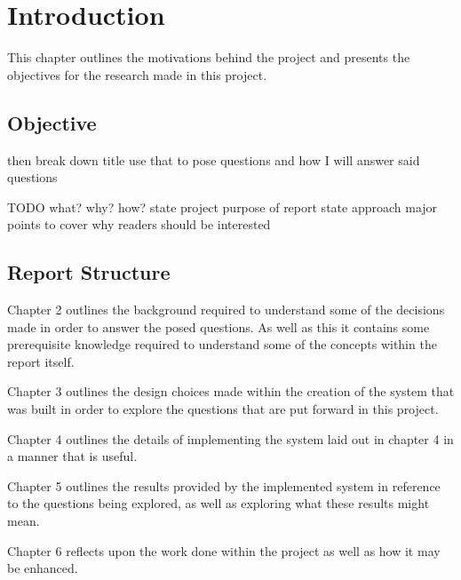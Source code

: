 
\chapter{Introduction}

This chapter outlines the motivations behind the project and presents the objectives for the research made in this project.

\section{Objective}

\thesistitle
then break down title
use that to pose questions
and how I will answer said questions

TODO what? why? how?
state project
purpose of report
state approach
major points to cover
why readers should be interested

\section{Report Structure}

Chapter 2 outlines the background required to understand some of the decisions made in order to answer the posed questions. As well as this it contains some prerequisite knowledge required to understand some of the concepts within the report itself.

Chapter 3 outlines the design choices made within the creation of the system that was built in order to explore the questions that are put forward in this project.

Chapter 4 outlines the details of implementing the system laid out in chapter 4 in a manner that is useful.

Chapter 5 outlines the results provided by the implemented system in reference to the questions being explored, as well as exploring what these results might mean.

Chapter 6 reflects upon the work done within the project as well as how it may be enhanced.